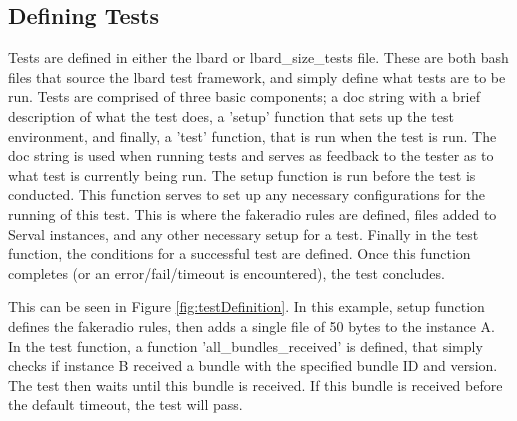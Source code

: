 \subsection{Defining Tests}
Tests are defined in either the lbard or lbard\_size\_tests file. 
These are both bash files that source the lbard test framework, and simply define what tests are to be run.
Tests are comprised of three basic components; a doc string with a brief description of what the test does, a 'setup' function that sets up the test environment, and finally, a 'test' function, that is run when the test is run.
The doc string is used when running tests and serves as feedback to the tester as to what test is currently being run.
The setup function is run before the test is conducted. This function serves to set up any necessary configurations for the running of this test. This is where the fakeradio rules are defined, files added to Serval instances, and any other necessary setup for a test.
Finally in the test function, the conditions for a successful test are defined. Once this function completes (or an error/fail/timeout is encountered), the test concludes.


This can be seen in Figure \ref{fig:testDefinition}. 
In this example, setup function defines the fakeradio rules, then adds a single file of 50 bytes to the instance A. 
In the test function, a function 'all\_bundles\_received' is defined, that simply checks if instance B received a bundle with the specified bundle ID and version. 
The test then waits until this bundle is received. 
If this bundle is received before the default timeout, the test will pass.

